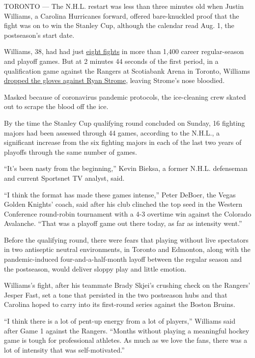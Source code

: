 TORONTO --- The N.H.L. restart was less than three minutes old when
Justin Williams, a Carolina Hurricanes forward, offered bare-knuckled
proof that the fight was on to win the Stanley Cup, although the
calendar read Aug. 1, the postseason's start date.

Williams, 38, had had just
\href{https://www.hockeyfights.com/players/5255}{eight fights} in more
than 1,400 career regular-season and playoff games. But at 2 minutes 44
seconds of the first period, in a qualification game against the Rangers
at Scotiabank Arena in Toronto, Williams
\href{https://www.youtube.com/watch?v=RaocSCQWL_8}{dropped the gloves
against Ryan Strome}, leaving Strome's nose bloodied.

Masked because of coronavirus pandemic protocols, the ice-cleaning crew
skated out to scrape the blood off the ice.

By the time the Stanley Cup qualifying round concluded on Sunday, 16
fighting majors had been assessed through 44 games, according to the
N.H.L., a significant increase from the six fighting majors in each of
the last two years of playoffs through the same number of games.

``It's been nasty from the beginning,'' Kevin Bieksa, a former N.H.L.
defenseman and current Sportsnet TV analyst, said.

``I think the format has made these games intense,'' Peter DeBoer, the
Vegas Golden Knights' coach, said after his club clinched the top seed
in the Western Conference round-robin tournament with a 4-3 overtime win
against the Colorado Avalanche. ``That was a playoff game out there
today, as far as intensity went.''

Before the qualifying round, there were fears that playing without live
spectators in two antiseptic neutral environments, in Toronto and
Edmonton, along with the pandemic-induced four-and-a-half-month layoff
between the regular season and the postseason, would deliver sloppy play
and little emotion.

Williams's fight, after his teammate Brady Skjei's crushing check on the
Rangers' Jesper Fast, set a tone that persisted in the two postseason
hubs and that Carolina hoped to carry into its first-round series
against the Boston Bruins.

``I think there is a lot of pent-up energy from a lot of players,''
Williams said after Game 1 against the Rangers. ``Months without playing
a meaningful hockey game is tough for professional athletes. As much as
we love the fans, there was a lot of intensity that was
self-motivated.''

